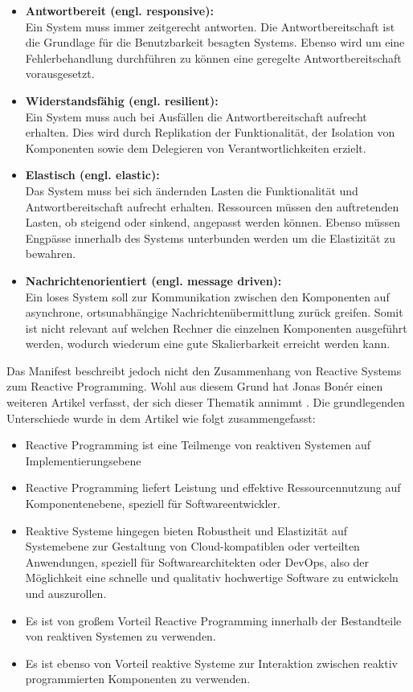 \begin{itemize}
	\item \textbf{Antwortbereit (engl. responsive):}\\ Ein System muss immer zeitgerecht antworten. Die Antwortbereitschaft ist die Grundlage für die Benutzbarkeit besagten Systems. Ebenso wird um eine Fehlerbehandlung durchführen zu können eine geregelte Antwortbereitschaft vorausgesetzt.
	\item \textbf{Widerstandsfähig (engl. resilient):}\\ Ein System muss auch bei Ausfällen die Antwortbereitschaft aufrecht erhalten. Dies wird durch Replikation der Funktionalität, der Isolation von Komponenten sowie dem Delegieren von Verantwortlichkeiten erzielt. 
	\item \textbf{Elastisch (engl. elastic):}\\ Das System muss bei sich ändernden Lasten die Funktionalität und Antwortbereitschaft aufrecht erhalten. Ressourcen müssen den auftretenden Lasten, ob steigend oder sinkend, angepasst werden können. Ebenso müssen Engpässe innerhalb des Systems unterbunden werden um die Elastizität zu bewahren.
	\item \textbf{Nachrichtenorientiert (engl. message driven):}\\ Ein loses System soll zur Kommunikation zwischen den Komponenten auf asynchrone, ortsunabhängige Nachrichtenübermittlung zurück greifen. Somit ist nicht relevant auf welchen Rechner die einzelnen Komponenten ausgeführt werden, wodurch wiederum eine gute Skalierbarkeit erreicht werden kann.
\end{itemize}
Das Manifest beschreibt jedoch nicht den Zusammenhang von Reactive Systems zum Reactive Programming. Wohl aus diesem Grund hat Jonas Bonér einen weiteren Artikel verfasst, der sich dieser Thematik annimmt \cite{Boner.}. Die grundlegenden Unterschiede wurde in dem Artikel wie folgt zusammengefasst:
\begin{itemize}
	\item Reactive Programming ist eine Teilmenge von reaktiven Systemen auf Implementierungsebene
	\item Reactive Programming liefert Leistung und effektive Ressourcennutzung auf Komponentenebene, speziell für Softwareentwickler.
	\item Reaktive Systeme hingegen bieten Robustheit und Elastizität auf Systemebene zur Gestaltung von Cloud-kompatiblen oder verteilten Anwendungen, speziell für Softwarearchitekten oder DevOps, also der Möglichkeit eine schnelle und qualitativ hochwertige Software zu entwickeln und auszurollen.
	\item Es ist von großem Vorteil Reactive Programming innerhalb der Bestandteile von reaktiven Systemen zu verwenden.
	\item Es ist ebenso von Vorteil reaktive Systeme zur Interaktion zwischen reaktiv programmierten Komponenten zu verwenden.
\end{itemize}
